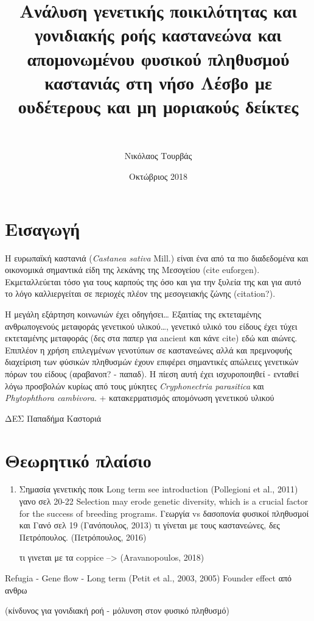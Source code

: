 \documentclass[12pt,a4paper,]{report}
\title{Ανάλυση γενετικής ποικιλότητας και γονιδιακής ροής καστανεώνα και
απομονωμένου φυσικού πληθυσμού καστανιάς στη νήσο Λέσβο με ουδέτερους
και μη μοριακούς δείκτες}
\subtitle{~}
\author{Νικόλαος Τουρβάς}
\date{Οκτώβριος 2018}
\begin{document}
\maketitle

\section{Εισαγωγή}

Η ευρωπαϊκή καστανιά (\emph{Castanea sativa} Mill.) είναι ένα από τα πιο
διαδεδομένα και οικονομικά σημαντικά είδη της λεκάνης της Μεσογείου
(cite euforgen). Εκμεταλλεύεται τόσο για τους καρπούς της όσο και για
την ξυλεία της και για αυτό το λόγο καλλιεργείται σε περιοχές πλέον της
μεσογειακής ζώνης (citation?).

Η μεγάλη εξάρτηση κοινωνιών έχει οδηγήσει\ldots{} Εξαιτίας της
εκτεταμένης ανθρωπογενούς μεταφοράς γενετικού υλικού\ldots{}, γενετικό
υλικό του είδους έχει τύχει εκτεταμένης μεταφοράς (δες στα παπερ για
ancient και κάνε cite) εδώ και αιώνες. Επιπλέον η χρήση επιλεγμένων
γενοτύπων σε καστανεώνες αλλά και πρεμνοφυής διαχείριση των φύσικών
πληθυσμών έχουν επιφέρει σημαντικές απώλειες γενετικών πόρων του είδους
(αραβανοπ? - παπαδ). Η πίεση αυτή έχει ισχυροποιηθεί - ενταθεί λόγω
προσβολών κυρίως από τους μύκητες \emph{Cryphonectria parasitica} και
\emph{Phytophthora cambivora}. + κατακερματισμός απομόνωση γενετικού
υλικού

ΔΕΣ Παπαδήμα Καστοριά

\hypertarget{-}{%
\section{Θεωρητικό πλαίσιο}\label{-}}

\begin{enumerate}
\def\labelenumi{\arabic{enumi}.}
\item
  Σημασία γενετικής ποικ Long term see introduction (Pollegioni et al.,
  2011) γανο σελ 20-22 Selection may erode genetic diversity, which is a
  crucial factor for the success of breeding programs. Γεωργία vs
  δασοπονία φυσικοί πληθυσμοί και Γανό σελ 19 (Γανόπουλος, 2013) τι
  γίνεται με τους καστανεώνες, δες Πετρόπουλος. (Πετρόπουλος, 2016)

  τι γινεται με τα coppice --\textgreater{} (Aravanopoulos, 2018)
\end{enumerate}

Refugia - Gene flow - Long term (Petit et al., 2003, 2005) Founder
effect από ανθρω

(κίνδυνος για γονιδιακή ροή - μόλυνση στον φυσικό πληθυσμό)
\end{document}
